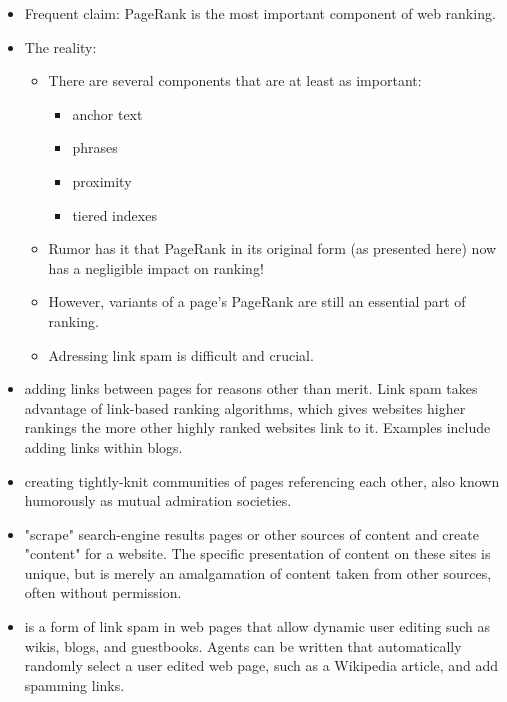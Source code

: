 \documentclass[a4paper,landscape,headrule,footrule,xetex]{foils}
\begin{document}

\begin{itemize}
\item Frequent claim: PageRank is the most important
  component of web ranking.
\item The reality: 
\begin{itemize}
\item There are several components that are at least as
  important:
  \begin{itemize}
  \item  anchor text
  \item phrases
  \item proximity
  \item tiered indexes
  \end{itemize}
\item Rumor has it that PageRank in its original form (as
  presented here) now has a negligible impact on ranking!
\item However, variants of a page's PageRank are still an
  essential part of ranking.
\item Adressing link spam is difficult and crucial.
\end{itemize}
\end{itemize}



\begin{itemize}
\item {} adding links between pages for reasons other
  than merit.  Link spam takes advantage of link-based ranking
  algorithms, which gives websites higher rankings the more other
  highly ranked websites link to it.  Examples include adding links
  within blogs.
\item {} creating tightly-knit communities of pages
  referencing each other, also known humorously as mutual admiration
  societies.
\item {}  "scrape" search-engine results pages or other sources of content and create "content" for a website. The specific presentation of content on these sites is unique, but is merely an amalgamation of content taken from other sources, often without permission.
\newpage
\item {} is a form of link spam in web pages that
  allow dynamic user editing such as wikis, blogs, and guestbooks.
  Agents can be written that automatically randomly select a user
  edited web page, such as a Wikipedia article, and add spamming
  links.
\end{itemize}
\end{document}
